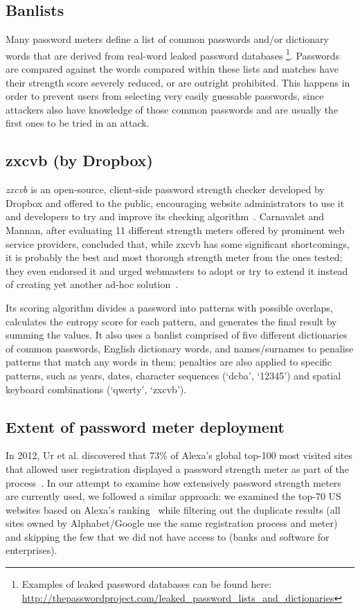   \subsection{Banlists}
    \label{ssec:banlists}
    Many password meters define a list of common passwords and/or dictionary words that are derived from real-word leaked password databases \footnote{Examples of leaked password databases can be found here: \url{http://thepasswordproject.com/leaked_password_lists_and_dictionaries}}. Passwords are compared against the words compared within these lists and matches have their strength score severely reduced, or are outright prohibited. This happens in order to prevent users from selecting very easily guessable passwords, since attackers also have knowledge of those common passwords and are usually the first ones to be tried in an attack.

  \subsection{zxcvb (by Dropbox)}
    \label{ssec:zxcvb}
    \emph{zxcvb} is an open-source, client-side password strength checker developed by Dropbox and offered to the public, encouraging website administrators to use it and developers to try and improve its checking algorithm~\cite{dropbox_str}. Carnavalet and Mannan, after evaluating 11 different strength meters offered by prominent web service providers, concluded that, while zxcvb has some significant shortcomings, it is probably the best and most thorough strength meter from the ones tested; they even endorsed it and urged webmasters to adopt or try to extend it instead of creating yet another ad-hoc solution~\cite{pass_str_meter_analysis}.

    Its scoring algorithm divides a password into patterns with possible overlaps, calculates the entropy score for each pattern, and generates the final result by summing the values. It also uses a banlist comprised of five different dictionaries of common passwords, English dictionary words, and names/surnames to penalise patterns that match any words in them; penalties are also applied to specific patterns, such as years, dates, character sequences (\eg `dcba', `12345') and spatial keyboard combinations (\eg `qwerty', `zxcvb').

  \subsection{Extent of password meter deployment}
    \label{ssec:meter_extent_use}
    In 2012, Ur et al. discovered that 73\% of Alexa's global top-100 most visited sites that allowed user registration displayed a password strength meter as part of the process~\cite{strength_meter_effect}. In our attempt to examine how extensively password strength meters are currently used, we followed a similar approach: we examined the top-70 US websites based on Alexa's ranking~\cite{alexa_100} while filtering out the duplicate results (\eg all sites owned by Alphabet/Google use the same registration process and meter) and skipping the few that we did not have access to (banks and software for enterprises).

